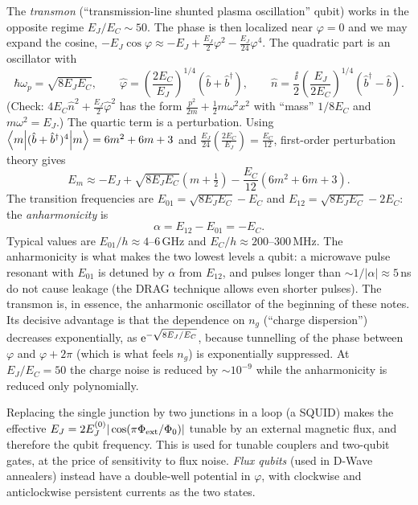 The \emph{transmon} (``transmission-line shunted plasma oscillation'' qubit) \cite{Koch2007} works in the opposite regime $E_J/E_C\sim50$. The phase is then localized near $\varphi=0$ and we may expand the cosine,
$-E_J\cos\varphi\approx-E_J+\frac{E_J}2\varphi^2-\frac{E_J}{24}\varphi^4$. The quadratic part is an oscillator with
\begin{equation}
  \hbar\omega_p=\sqrt{8E_JE_C},\qquad\hat\varphi=\left(\frac{2E_C}{E_J}\right)^{1/4}(\hat b+\hat b^\dagger),\qquad\hat n=\frac\ii2\left(\frac{E_J}{2E_C}\right)^{1/4}(\hat b^\dagger-\hat b).
\end{equation}
(Check: $4E_C\hat n^2+\frac{E_J}2\hat\varphi^2$ has the form $\frac{p^2}{2m}+\frac12m\omega^2x^2$ with ``mass'' $1/8E_C$ and $m\omega^2=E_J$.) The quartic term is a perturbation. Using $\left\langle m\middle|(\hat b+\hat b^\dagger)^4\middle|m\right\rangle=6m^2+6m+3$ and
$\frac{E_J}{24}\left(\frac{2E_C}{E_J}\right)=\frac{E_C}{12}$, first-order perturbation theory gives
\begin{equation}
  E_m\approx-E_J+\sqrt{8E_JE_C}\left(m+\tfrac12\right)-\frac{E_C}{12}\left(6m^2+6m+3\right).
\end{equation}
The transition frequencies are $E_{01}=\sqrt{8E_JE_C}-E_C$ and $E_{12}=\sqrt{8E_JE_C}-2E_C$: the \emph{anharmonicity} is
\begin{equation}
  \alpha=E_{12}-E_{01}=-E_C.
\end{equation}
Typical values are $E_{01}/h\approx4$--$6$\,GHz and $E_C/h\approx200$--$300$\,MHz. The anharmonicity is what makes the two lowest levels a qubit: a microwave pulse resonant with $E_{01}$ is detuned by $\alpha$ from $E_{12}$, and pulses longer than
$\sim1/|\alpha|\approx5$\,ns do not cause leakage (the DRAG technique allows even shorter pulses). The transmon is, in essence, the anharmonic oscillator of the beginning of these notes. Its decisive advantage is that the dependence on $n_g$
(``charge dispersion'') decreases exponentially, as $\mathrm e^{-\sqrt{8E_J/E_C}}$, because tunnelling of the phase between $\varphi$ and $\varphi+2\pi$ (which is what feels $n_g$) is exponentially suppressed. At $E_J/E_C=50$ the charge noise is
reduced by $\sim10^{-9}$ while the anharmonicity is reduced only polynomially.

Replacing the single junction by two junctions in a loop (a SQUID) makes the effective $E_J=2E_J^{(0)}|\cos(\pi\Phi_{\rm ext}/\Phi_0)|$ tunable by an external magnetic flux, and therefore the qubit frequency. This is used for tunable couplers and
two-qubit gates, at the price of sensitivity to flux noise. \emph{Flux qubits} (used in D-Wave annealers) instead have a double-well potential in $\varphi$, with clockwise and anticlockwise persistent currents as the two states.

